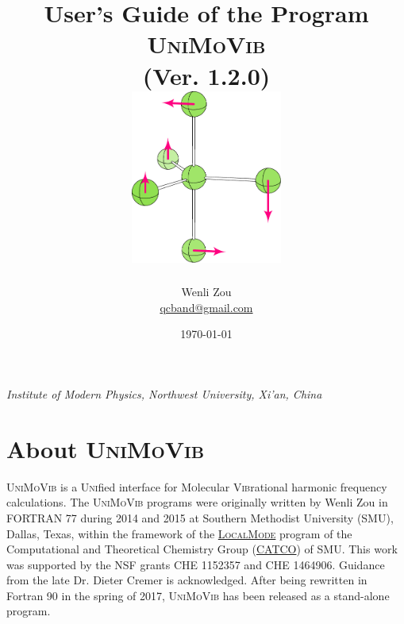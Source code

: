 \documentclass[12pt,english]{extarticle}
\begin{document}
\title{User's Guide of the Program \textsc{UniMoVib} \\
\vspace{10 mm} (Ver. 1.2.0) \vspace{30 mm} \\
\includegraphics[width=50.0mm]{fig/logo} \vspace{30 mm} }

\date{\today}

\author{Wenli Zou \\ \vspace{5mm}
\href{mailto:qcband@gmail.com}{qcband@gmail.com} \\ \vspace{10mm}}

\maketitle
\setcounter{page}{0}
\thispagestyle{empty}

\begin{center}
\emph{Institute of Modern Physics, Northwest University, Xi'an, China}
\end{center}

\pagebreak{}

\tableofcontents{}

\pagebreak{}

\section{About \textsc{UniMoVib}} \label{part:about}

\textsc{UniMoVib} is a \textsc{Uni}fied interface for \textsc{Mo}lecular \textsc{Vib}rational harmonic frequency calculations. The \textsc{UniMoVib} programs were originally written by Wenli Zou in FORTRAN 77 during 2014 and 2015 at Southern Methodist University (SMU), Dallas,
Texas, within the framework of the \href{https://github.com/catco-smu}{\textsc{LocalMode}} program of the Computational and Theoretical Chemistry Group (\href{https://sites.smu.edu/dedman/catco/}{CATCO}) of SMU. This work was
supported by the NSF grants CHE 1152357 and CHE 1464906. Guidance from the late Dr. Dieter Cremer is acknowledged. After being rewritten in Fortran 90 in the spring of 2017, \textsc{UniMoVib} has been released as a stand-alone program.
\end{document}

